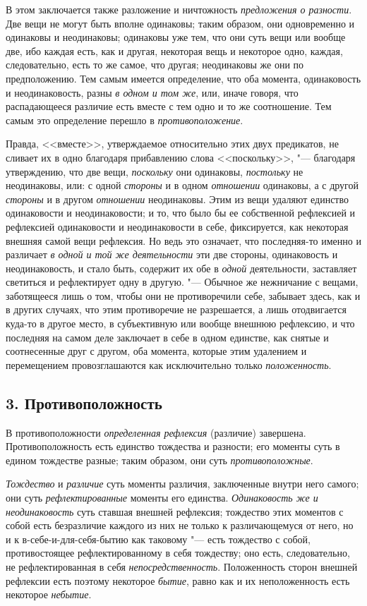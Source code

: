 В этом заключается также разложение и ничтожность{\em
предложения о разности}. Две вещи не могут быть вполне одинаковы; таким
образом, они одновременно и одинаковы и неодинаковы; одинаковы уже тем, что
они суть вещи или вообще две, ибо каждая есть, как и другая, некоторая вещь
и некоторое одно, каждая, следовательно, есть то же самое, что другая;
неодинаковы же они по предположению. Тем самым имеется определение, что оба
момента, одинаковость и неодинаковость, разны {\em в
одном и том же}, или, иначе говоря, что распадающееся различие есть вместе
с тем одно и то же соотношение. Тем самым это определение перешло в
{\em противоположение}.

Правда, <<вместе>>, утверждаемое относительно этих двух предикатов, не сливает
их в одно благодаря прибавлению слова <<поскольку>>, "--- благодаря
утверждению, что две вещи, {\em поскольку} они
одинаковы, {\em постольку} не неодинаковы, или: с одной
{\em стороны} и в одном {\em отношении} одинаковы, а с другой
{\em стороны} и в другом {\em отношении} неодинаковы. Этим из вещи удаляют
единство одинаковости и неодинаковости; и то, что было бы ее собственной
рефлексией и рефлексией одинаковости и неодинаковости в себе, фиксируется,
как некоторая внешняя самой вещи рефлексия. Но ведь это означает, что
последняя-то именно и различает {\em в одной и той же
деятельности} эти две стороны, одинаковость и неодинаковость, и стало быть,
содержит их обе в {\em одной} деятельности, заставляет
светиться и рефлектирует одну в другую. "--- Обычное же нежничание с вещами,
заботящееся лишь о том, чтобы они не противоречили себе, забывает здесь,
как и в других случаях, что этим противоречие не разрешается, а лишь
отодвигается куда-то в другое место, в субъективную или вообще внешнюю
рефлексию, и что последняя на самом деле заключает в себе в одном единстве,
как снятые и соотнесенные друг с другом, оба момента, которые этим
удалением и перемещением провозглашаются как исключительно только
{\em положенность}.


\subsection[3. Противоположность]{3. Противоположность}
В противоположности {\em определенная рефлексия} (различие) завершена.
Противоположность есть единство тождества и разности; его моменты суть в
едином тождестве разные; таким образом, они суть {\em противоположные}.

{\em Тождество} и {\em различие}
суть моменты различия, заключенные внутри него самого; они суть
{\em рефлектированные} моменты его единства.
{\em Одинаковость же и неодинаковость} суть ставшая
внешней рефлексия; тождество этих моментов с собой есть безразличие каждого
из них не только к различающемуся от него, но и к в-себе-и-для-себя-бытию
как таковому "--- есть тождество с собой, противостоящее рефлектированному в
себя тождеству; оно есть, следовательно, не рефлектированная в себя
{\em непосредственность}. Положенность сторон внешней
рефлексии есть поэтому некоторое {\em бытие}, равно как
и их неположенность есть некоторое {\em небытие}.

